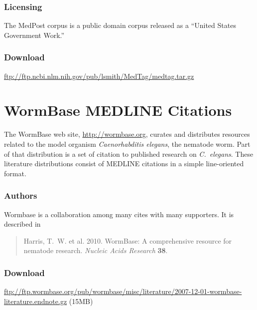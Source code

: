 \subsubsection{Licensing}

The MedPost corpus is a public domain corpus released as a ``United
States Government Work.''

\subsubsection{Download}

\url{ftp://ftp.ncbi.nlm.nih.gov/pub/lsmith/MedTag/medtag.tar.gz}




\section{WormBase MEDLINE Citations}\label{section:corpora-wormbase}

The WormBase web site, \url{http://wormbase.org}, curates and distributes
resources related to the model organism {\it Caenorhabditis elegans},
the nematode worm.  Part of that distribution is a set of citation to
published research on {\it C.~elegans}.  These literature
distributions consist of MEDLINE citations in a simple line-oriented
format.

\subsubsection{Authors}

Wormbase is a collaboration among many cites with many supporters.
It is described in 
%
\begin{quote}
Harris, T.~W. et al. 2010. WormBase: A comprehensive resource for
nematode research. {\it Nucleic Acids Research} {\bf 38}.
\end{quote}

\subsubsection{Download}

\url{ftp://ftp.wormbase.org/pub/wormbase/misc/literature/2007-12-01-wormbase-literature.endnote.gz} (15MB)

